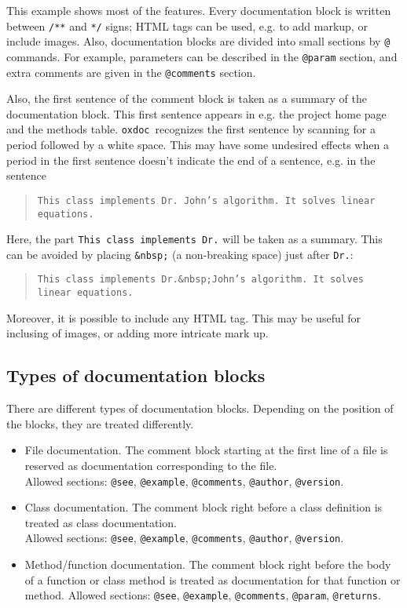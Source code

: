 \documentclass{article}
\newcommand\oxdoc{{\tt oxdoc}}
\begin{document}
This example shows most of the features. Every documentation block is written
between {\tt /**} and {\tt **/} signs; HTML tags can be used, e.g. to add
markup, or include images. Also, documentation blocks are divided into small
sections by {\tt @} commands. For example, parameters can be described in the {\tt @param}
section, and extra comments are given in the {\tt @comments} section. 

Also, the first sentence of the comment block is taken as a summary of the
documentation block.  This first sentence appears in e.g. the project home
page and the methods table.  \oxdoc~recognizes the first sentence by
scanning for a period followed by a white space.  This may have some undesired
effects when a period in the first sentence doesn't indicate the end of a
sentence, e.g. in the sentence 
\begin{quote}
\tt This class implements Dr. John's algorithm. It solves linear equations.
\end{quote}
Here, the part {\tt This class implements Dr.} will be taken as a summary.
This can be avoided by placing {\tt \&nbsp;} (a non-breaking space)
just after {\tt Dr.}:
\begin{quote}
\tt This class implements Dr.\&nbsp;John's algorithm. It solves linear equations.
\end{quote}

Moreover, it is possible to include any HTML tag. This may be useful for
inclusing of images, or adding more intricate mark up.


\subsection{Types of documentation blocks}
There are different types of documentation blocks.  Depending on the position of the blocks, they are
treated differently.

\begin{itemize}
\item File documentation.  The comment block starting at the first line of a file is reserved as
documentation corresponding to the file. \\
Allowed sections: {\tt @see}, {\tt @example}, {\tt @comments}, {\tt @author}, 
{\tt @version}.

\item Class documentation.  The comment block right before a class definition is treated as
class documentation. \\
Allowed sections: {\tt @see}, {\tt @example}, {\tt @comments}, {\tt @author}, 
{\tt @version}.

\item Method/function documentation.  The comment block right before the body of a function or class method
is treated as documentation for that function or method.
Allowed sections: {\tt @see}, {\tt @example}, {\tt @comments}, {\tt @param}, {\tt @returns}.
\end{itemize}
\end{document}

